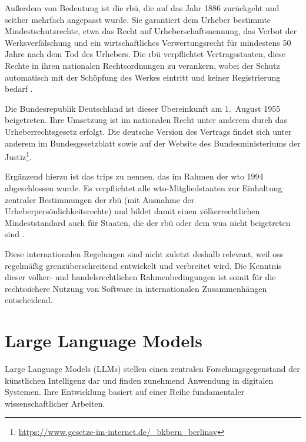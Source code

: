 Außerdem von Bedeutung ist die \gls{rbü}, die auf das Jahr 1886 zurückgeht und seither mehrfach angepasst wurde.
Sie garantiert dem Urheber bestimmte Mindestschutzrechte, etwa das Recht auf Urheberschaftsnennung, das Verbot der Werksverfälschung und ein wirtschaftliches Verwertungsrecht für mindestens 50 Jahre nach dem Tod des Urhebers.
Die \gls{rbü} verpflichtet Vertragsstaaten, diese Rechte in ihren nationalen Rechtsordnungen zu verankern, wobei der Schutz automatisch mit der Schöpfung des Werkes eintritt und keiner Registrierung bedarf \autocite{meckel_definition_nodate-1}.

Die Bundesrepublik Deutschland ist dieser Übereinkunft am 1.\ August 1955 beigetreten.
Ihre Umsetzung ist im nationalen Recht unter anderem durch das Urheberrechtsgesetz erfolgt.
Die deutsche Version des Vertrags findet sich unter anderem im Bundesgesetzblatt sowie auf der Website des Bundesministeriums der Justiz\footnote{\url{https://www.gesetze-im-internet.de/\_bkbern\_berlinav}}.

Ergänzend hierzu ist das \gls{trips} zu nennen, das im Rahmen der \gls{wto} 1994 abgeschlossen wurde.
Es verpflichtet alle \gls{wto}-Mitgliedstaaten zur Einhaltung zentraler Bestimmungen der \gls{rbü} (mit Ausnahme der Urheberpersönlichkeitsrechte) und bildet damit einen völkerrechtlichen Mindeststandard auch für Staaten, die der \gls{rbü} oder dem \gls{wua} nicht beigetreten sind \autocite{malbon_standards_2014}.

Diese internationalen Regelungen sind nicht zuletzt deshalb relevant, weil \gls{oss} regelmäßig grenzüberschreitend entwickelt und verbreitet wird.
Die Kenntnis dieser völker- und handelsrechtlichen Rahmenbedingungen ist somit für die rechtssichere Nutzung von Software in internationalen Zusammenhängen entscheidend.


\section{Large Language Models}

Large Language Models (LLMs) stellen einen zentralen Forschungsgegenstand der künstlichen Intelligenz dar und finden zunehmend Anwendung in digitalen Systemen.
Ihre Entwicklung basiert auf einer Reihe fundamentaler wissenschaftlicher Arbeiten.

